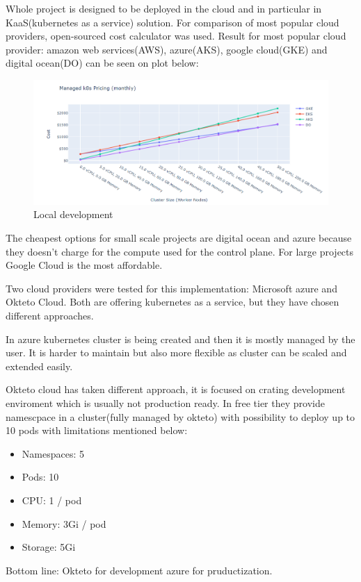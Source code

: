 Whole project is designed to be deployed in the cloud and in particular in KaaS(kubernetes as a service) solution. For comparison of most popular cloud providers, open-sourced cost calculator\cite{managed_kubernetes_pricing} was used. Result for most popular cloud provider: amazon web services(AWS), azure(AKS), google cloud(GKE) and digital ocean(DO) can be seen on plot below:

\begin{figure}[H]
    \centering
    \includegraphics[width=01\textwidth]{pictures/k8s_cost.png}
    \caption{ Local development }
    \label{fig:k8s_cost}
\end{figure}

The cheapest options for small scale projects are digital ocean and azure because they doesn't charge for the compute used for the control plane. For large projects Google Cloud is the most affordable. 

Two cloud  providers were tested for this implementation: Microsoft azure and Okteto Cloud. Both are offering kubernetes as a service, but they have chosen different approaches. 

In azure kubernetes cluster is being created and then it is mostly managed by the user. It is harder to maintain but also more flexible as cluster can be scaled and extended easily.  

Okteto cloud has taken different approach, it is focused on crating development enviroment which is usually not production ready. In free tier they provide namescpace in a cluster(fully managed by okteto) with possibility to deploy up to 10 pods with limitations mentioned below:
\begin{itemize}
    \item Namespaces: 5
    \item Pods: 10
    \item CPU: 1 / pod
    \item Memory: 3Gi / pod
    \item Storage: 5Gi
\end{itemize}

Bottom line: Okteto for development azure for pruductization.